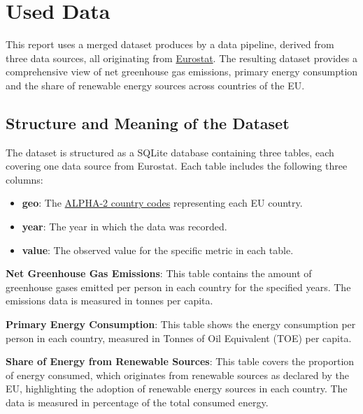 \documentclass{article}
\begin{document}
\section*{Used Data}
This report uses a merged dataset produces by a data pipeline, derived from three data sources,
all originating from \href{https://ec.europa.eu/eurostat}{Eurostat}.
The resulting dataset provides a comprehensive view of net greenhouse gas emissions, primary energy consumption
and the share of renewable energy sources across countries of the EU.

\subsection*{Structure and Meaning of the Dataset}
The dataset is structured as a SQLite database containing three tables, each covering one data source from Eurostat.
Each table includes the following three columns:
\begin{itemize}
    \item \textbf{geo}: The \href{https://www.destatis.de/Europa/EN/Country/Country-Codes.html}{ALPHA-2 country codes} representing each EU country.
    \item \textbf{year}: The year in which the data was recorded.
    \item \textbf{value}: The observed value for the specific metric in each table.
\end{itemize}

\textbf{Net Greenhouse Gas Emissions}:
This table contains the amount of greenhouse gases emitted per person in each country for the specified years.
The emissions data is measured in tonnes per capita.

\textbf{Primary Energy Consumption}:
This table shows the energy consumption per person in each country, measured in Tonnes of Oil Equivalent (TOE) per capita.

\textbf{Share of Energy from Renewable Sources}:
This table covers the proportion of energy consumed, which originates from renewable sources as declared by the EU,
highlighting the adoption of renewable energy sources in each country.
The data is measured in percentage of the total consumed energy.
\end{document}
